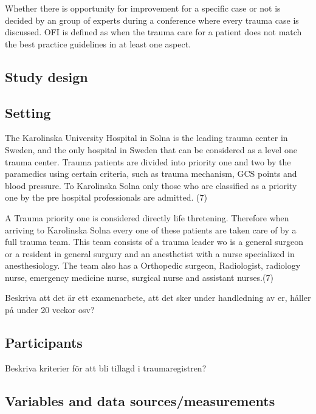 \documentclass[
]{article}
\begin{document}
Whether there is opportunity for improvement for a specific case or not
is decided by an group of experts during a conference where every trauma
case is discussed. OFI is defined as when the trauma care for a patient
does not match the best practice guidelines in at least one aspect.

\hypertarget{study-design}{%
\subsection{Study design}\label{study-design}}

\hypertarget{setting}{%
\subsection{Setting}\label{setting}}

The Karolinska University Hospital in Solna is the leading trauma center
in Sweden, and the only hospital in Sweden that can be considered as a
level one trauma center. Trauma patients are divided into priority one
and two by the paramedics using certain criteria, such as trauma
mechanism, GCS points and blood pressure. To Karolinska Solna only those
who are classified as a priority one by the pre hospital professionals
are admitted. (7)

A Trauma priority one is considered directly life thretening. Therefore
when arriving to Karolinska Solna every one of these patients are taken
care of by a full trauma team. This team consists of a trauma leader wo
is a general surgeon or a resident in general surgury and an anesthetist
with a nurse specialized in anesthesiology. The team also has a
Orthopedic surgeon, Radiologist, radiology nurse, emergency medicine
nurse, surgical nurse and assistant nurses.(7)

Beskriva att det är ett examenarbete, att det sker under handledning av
er, håller på under 20 veckor osv?

\hypertarget{participants}{%
\subsection{Participants}\label{participants}}

Beskriva kriterier för att bli tillagd i traumaregistren?

\hypertarget{variables-and-data-sourcesmeasurements}{%
\subsection{Variables and data
sources/measurements}\label{variables-and-data-sourcesmeasurements}}
\end{document}
